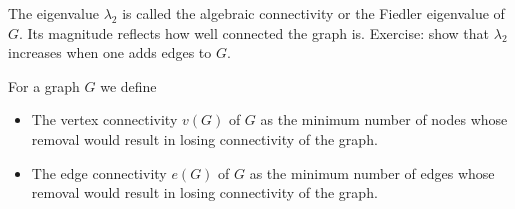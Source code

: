 \documentclass[11pt,nocut]{article}
\begin{document}
The eigenvalue $\lambda_2$ is called the algebraic connectivity or the Fiedler eigenvalue of $G$. Its magnitude reflects how well connected the graph is.
Exercise: show that $\lambda_2$ increases when one adds edges to $G$.

\begin{definition}
	For a graph $G$ we define
	\begin{itemize}
		\item The vertex connectivity $v(G)$ of $G$ as the minimum number of nodes whose removal would result in losing connectivity of the graph.
		\item The edge connectivity $e(G)$ of $G$ as the minimum number of edges whose removal would result in losing connectivity of the graph.
	\end{itemize}
\end{definition}
\end{document}
